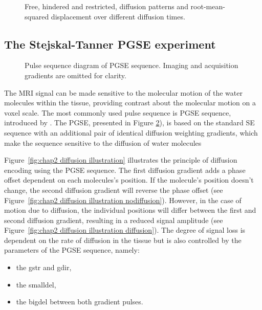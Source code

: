\begin{figure}
 \centering
  \hspace*{1cm}
  \caption{Free, hindered and restricted,  diffusion patterns and root-mean-squared displacement over different diffusion times.}
  \label{fig:chapter 2 types of diffusion}
\end{figure}

\subsection*{The Stejskal-Tanner PGSE experiment}
\begin{figure}[ht]
\centering
{}
\caption{Pulse sequence diagram of PGSE sequence. Imaging and acquisition gradients are omitted for clarity.}
\label{fig:chapter2 pgse_diagram}
\end{figure}

The MRI signal can be made sensitive to the molecular motion of the water molecules within the tissue, providing contrast about the molecular motion on a voxel scale. The most commonly used pulse sequence is {\gls{PGSE}} sequence, introduced by \citep{Stejskal:1966}. The {\gls{PGSE}}, presented in Figure \ref{fig:chapter2 pgse_diagram}), is based on the standard SE sequence with an additional pair of identical diffusion weighting gradients, which make the sequence sensitive to the diffusion of water molecules 



Figure~\ref{fig:chap2 diffusion illustration} illustrates the principle of diffusion encoding using the PGSE sequence. The first diffusion gradient adds a phase offset dependent on each molecules's position. If the molecule's position doesn't change, the second diffusion gradient will reverse the phase offset (see Figure~\ref{fig:chap2 diffusion illustration nodiffusion}). However, in the case of motion due to diffusion, the individual positions will differ between the first and second diffusion gradient, resulting in a reduced signal amplitude	(see Figure~\ref{fig:chap2 diffusion illustration diffusion}). The degree of signal loss is dependent on the rate of diffusion in the tissue but is also controlled by the parameters of the {\gls{PGSE}} sequence, namely:
\begin{itemize}
	\item the {\gls{gstr}} and {\gls{gdir}},
	\item the {\gls{smalldel}},
	\item the {\gls{bigdel}} between both gradient pulses.
\end{itemize}

